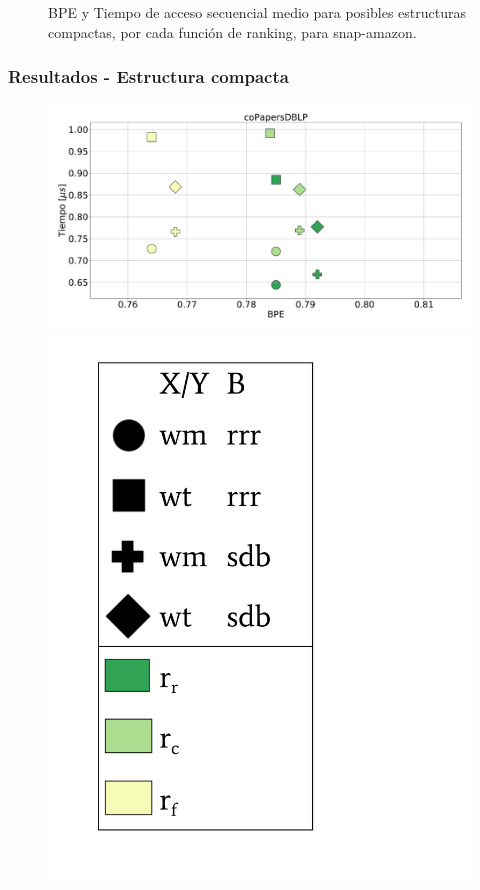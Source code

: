 \begin{frame}
\begin{figure}
	\caption{BPE y Tiempo de acceso secuencial medio para posibles estructuras compactas, por cada función de ranking, para snap-amazon.}
\end{figure}

\end{frame}

\begin{frame}
\frametitle{Resultados - Estructura compacta}

\begin{figure}
	\centering
	
    	\begin{minipage}{1\textwidth}
    		\centering
    		\begin{minipage}{0.8\textwidth}
    			\centering
    			\includegraphics[width=1\linewidth]{../img/sdsl/secuencialBig/coPapersDBLP.pdf}
    		\end{minipage}
    		\begin{minipage}{0.15\textwidth}
    			\centering
    			\includegraphics[scale=.15, clip, trim=70 0 0 0]{../img/sdsl/label.pdf}

\end{minipage}
\end{minipage}
\end{figure}
\end{frame}

